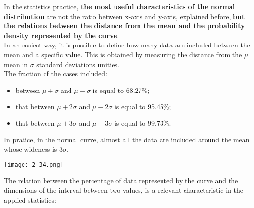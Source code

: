 
\begin{frame}
  \begin{small}
    \vspace*{.2cm}
    In the statistics practice, \textbf{the most useful characteristics of the normal distribution} are not the ratio between x-axis and y-axis, explained before, \textbf{but the relations between the distance from the mean and the probability density represented by the curve}.\\
    \vspace*{.2cm}
    In an easiest way, it is possible to define how many data are included between the mean and a specific value. This is obtained by measuring the distance from the {\boldmath$\mu$} mean in {\boldmath$\sigma$} standard deviations unities.\\
    \vspace*{.2cm}
    The fraction of the cases included:
    \begin{itemize}
      \item between $ \mu + \sigma $ and $ \mu - \sigma $ is equal to 68.27\%;
      \item that between $ \mu + 2 \sigma $ and $ \mu - 2 \sigma $ is equal to 95.45\%;
      \item that between $ \mu + 3 \sigma $ and $ \mu - 3 \sigma $ is equal to 99.73\%.
    \end{itemize}
    \vspace*{.2cm}
    In pratice, in the normal curve, almost all the data are included around the mean whose wideness is {\boldmath $ 3\sigma $}.
  \end{small}
\end{frame}

\begin{frame}
  \vspace*{.5cm}
  \begin{floatingfigure}[r]{8.5cm}
    \texttt{[image: 2\_34.png]} 
  \end{floatingfigure}
  The relation between the percentage of data represented by the curve and the dimensions of the interval between two values, is a relevant characteristic in the applied statistics:\\
\end{frame}


